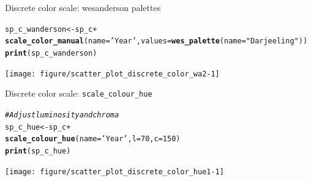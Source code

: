 \documentclass{beamer}\usepackage[]{graphicx}\usepackage[]{color}
\makeatletter
\newcommand{\hlnum}[1]{\textcolor[rgb]{0.686,0.059,0.569}{#1}}%
\newcommand{\hlstr}[1]{\textcolor[rgb]{0.192,0.494,0.8}{#1}}%
\newcommand{\hlcom}[1]{\textcolor[rgb]{0.678,0.584,0.686}{\textit{#1}}}%
\newcommand{\hlopt}[1]{\textcolor[rgb]{0,0,0}{#1}}%
\newcommand{\hlstd}[1]{\textcolor[rgb]{0.345,0.345,0.345}{#1}}%
\newcommand{\hlkwb}[1]{\textcolor[rgb]{0.69,0.353,0.396}{#1}}%
\newcommand{\hlkwc}[1]{\textcolor[rgb]{0.333,0.667,0.333}{#1}}%
\newcommand{\hlkwd}[1]{\textcolor[rgb]{0.737,0.353,0.396}{\textbf{#1}}}%
\newenvironment{kframe}{%
 \def\at@end@of@kframe{}%
 \ifinner\ifhmode%
  \def\at@end@of@kframe{\end{minipage}}%
  \begin{minipage}{\columnwidth}%
 \fi\fi%
 \def\FrameCommand##1{\hskip\@totalleftmargin \hskip-\fboxsep
 \colorbox{shadecolor}{##1}\hskip-\fboxsep
     \hskip-\linewidth \hskip-\@totalleftmargin \hskip\columnwidth}%
 \MakeFramed {\advance\hsize-\width
   \@totalleftmargin\z@ \linewidth\hsize
   \@setminipage}}%
 {\par\unskip\endMakeFramed%
 \at@end@of@kframe}
\newenvironment{knitrout}{}{} %
\makeatother
\begin{document}
\begin{frame}[fragile]{Discrete color scale: wesanderson palettes}
\begin{knitrout}\footnotesize
{}\color{fgcolor}\begin{kframe}
\begin{alltt}
\hlstd{sp_c_wanderson} \hlkwb{<-} \hlstd{sp_c} \hlopt{+}
  \hlkwd{scale_color_manual}\hlstd{(}\hlkwc{name}\hlstd{=}\hlstr{'Year'}\hlstd{,} \hlkwc{values}\hlstd{=}\hlkwd{wes_palette}\hlstd{(}\hlkwc{name}\hlstd{=}\hlstr{"Darjeeling"}\hlstd{))}
\hlkwd{print}\hlstd{(sp_c_wanderson)}
\end{alltt}


{\ttfamily\noindent\bfseries{}}\end{kframe}

{\centering \texttt{[image: figure/scatter\_plot\_discrete\_color\_wa2-1]} 

}



\end{knitrout}
\end{frame}

\begin{frame}[fragile]{Discrete color scale: \lstinline{scale_colour_hue}}
\begin{knitrout}\footnotesize
{}\color{fgcolor}\begin{kframe}
\begin{alltt}
\hlcom{# Adjust luminosity and chroma}
\hlstd{sp_c_hue} \hlkwb{<-} \hlstd{sp_c} \hlopt{+}
 \hlkwd{scale_colour_hue}\hlstd{(}\hlkwc{name}\hlstd{=}\hlstr{'Year'}\hlstd{,} \hlkwc{l}\hlstd{=}\hlnum{70}\hlstd{,} \hlkwc{c}\hlstd{=}\hlnum{150}\hlstd{)}
\hlkwd{print}\hlstd{(sp_c_hue)}
\end{alltt}
\end{kframe}

{\centering \texttt{[image: figure/scatter\_plot\_discrete\_color\_hue1-1]} 

}



\end{knitrout}
\end{frame}
\end{document}
